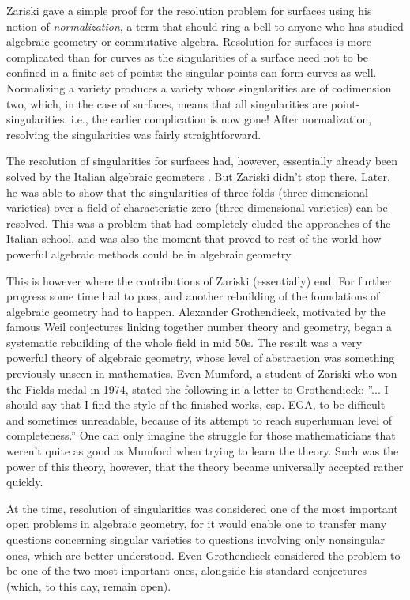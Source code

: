 \documentclass[12pt,a4paper,leqno]{article}
\theoremstyle{plain}
\theoremstyle{definition}
\theoremstyle{remark}
\begin{document}
Zariski gave a simple proof for the resolution problem for surfaces using his notion of \emph{normalization}, a term that should ring a bell to anyone who has studied algebraic geometry or commutative algebra. Resolution for surfaces is more complicated than for curves as the singularities of a surface need not to be confined in a finite set of points: the singular points can form curves as well. Normalizing a variety produces a variety whose singularities are of codimension two, which, in the case of surfaces, means that all singularities are point-singularities, i.e., the earlier complication is now gone! After normalization, resolving the singularities was fairly straightforward.

The resolution of singularities for surfaces had, however, essentially already been solved by the Italian algebraic geometers \cite{Par}. But Zariski didn't stop there. Later, he was able to show that the singularities of three-folds (three dimensional varieties) over a field of characteristic zero (three dimensional varieties) can be resolved. This was a problem that had completely eluded the approaches of the Italian school, and was also the moment that proved to rest of the world how powerful algebraic methods could be in algebraic geometry.

This is however where the contributions of Zariski (essentially) end. For further progress some time had to pass, and another rebuilding of the foundations of algebraic geometry had to happen. Alexander Grothendieck, motivated by the famous Weil conjectures linking together number theory and geometry, began a systematic rebuilding of the whole field in mid 50s. The result was a very powerful theory of algebraic geometry, whose level of abstraction was something previously unseen in mathematics. Even Mumford, a student of Zariski who won the Fields medal in 1974, stated the following in a letter to Grothendieck: ''... I should say that I find the style of the finished works, esp. EGA, to be difficult and sometimes unreadable, because of its attempt to reach superhuman level of completeness.'' \cite{Mum} One can only imagine the struggle for those mathematicians that weren't quite as good as Mumford when trying to learn the theory. Such was the power of this theory, however, that the theory became universally accepted rather quickly.

At the time, resolution of singularities was considered one of the most important open problems in algebraic geometry, for it would enable one to transfer many questions concerning singular varieties to questions involving only nonsingular ones, which are better understood. Even Grothendieck considered the problem to be one of the two most important ones, alongside his standard conjectures (which, to this day, remain open).
\end{document}
